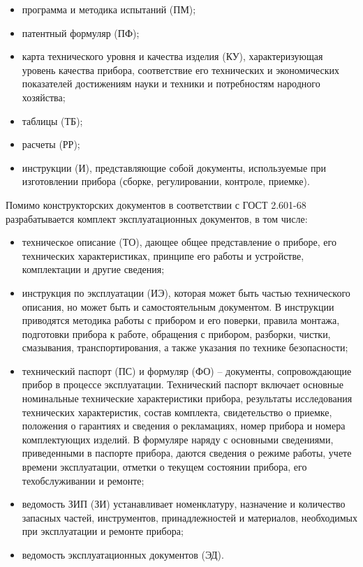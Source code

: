 \begin{itemize}
	\item программа и методика испытаний (ПМ);
	\item патентный формуляр (ПФ);
	\item карта технического уровня и качества изделия (КУ), характеризующая уровень качества прибора, соответствие его технических и экономических показателей достижениям науки и техники и потребностям народного хозяйства;
	\item таблицы (ТБ);
	\item расчеты (РР);
	\item инструкции (И), представляющие собой документы, используемые при изготовлении прибора (сборке, регулировании, контроле, приемке).
\end{itemize}

Помимо конструкторских документов в соответствии с ГОСТ 2.601-68 разрабатывается комплект эксплуатационных документов, в том числе:
\begin{itemize}
	\item техническое описание (ТО), дающее общее представление о приборе, его технических характеристиках, принципе его работы и устройстве, комплектации и другие сведения;
	\item инструкция по эксплуатации (ИЭ), которая может быть частью технического описания, но может быть и самостоятельным документом. В инструкции приводятся методика работы с прибором и его поверки, правила монтажа, подготовки прибора к работе, обращения с прибором, разборки, чистки, смазывания, транспортирования, а также указания по технике безопасности;
	\item технический паспорт (ПС) и формуляр (ФО) -- документы, сопровождающие прибор в процессе эксплуатации. Технический паспорт включает основные номинальные технические характеристики прибора, результаты исследования технических характеристик, состав комплекта, свидетельство о приемке, положения о гарантиях и сведения о рекламациях, номер прибора и номера комплектующих изделий. В формуляре наряду с основными сведениями, приведенными в паспорте прибора, даются сведения о режиме работы, учете времени эксплуатации, отметки о текущем состоянии прибора, его техобслуживании и ремонте;
	\item ведомость ЗИП (ЗИ) устанавливает номенклатуру, назначение и количество запасных частей, инструментов, принадлежностей и материалов, необходимых при эксплуатации и ремонте прибора;
	\item ведомость эксплуатационных документов (ЭД).
\end{itemize}

